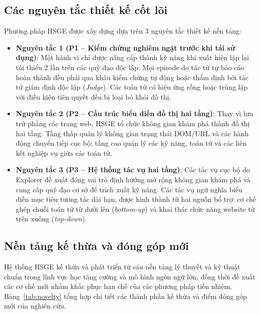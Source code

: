 \subsection{Các nguyên tắc thiết kế cốt lõi}

Phương pháp HSGE được xây dựng dựa trên 3 nguyên tắc thiết kế nền tảng:
\begin{itemize}
  \item \textbf{Nguyên tắc 1 (P1 -- Kiểm chứng nghiêm ngặt trước khi tái sử dụng)}: Một hành vi chỉ được nâng cấp thành kỹ năng khi xuất hiện lặp lại tối thiểu 2 lần trên các quỹ đạo độc lập. Mọi episode do tác tử tự báo cáo hoàn thành đều phải qua khâu kiểm chứng tự động hoặc thẩm định bởi tác tử giám định độc lập (\textit{Judge}). Các toán tử có hiệu ứng rỗng hoặc trùng lặp với điều kiện tiên quyết đều bị loại bỏ khỏi đồ thị.
  \item \textbf{Nguyên tắc 2 (P2 -- Cấu trúc biểu diễn đồ thị hai tầng)}: Thay vì lưu trữ phẳng các trang web, HSGE tổ chức không gian khám phá thành đồ thị hai tầng. Tầng thấp quản lý không gian trạng thái DOM/URL và các hành động chuyển tiếp cục bộ; tầng cao quản lý các kỹ năng, toán tử và các liên kết nghiệp vụ giữa các toán tử.
  \item \textbf{Nguyên tắc 3 (P3 -- Hệ thống tác vụ hai tầng)}: Các tác vụ cục bộ do Explorer đề xuất đóng vai trò định hướng mở rộng không gian khám phá và cung cấp quỹ đạo cơ sở để trích xuất kỹ năng. Các tác vụ ngữ nghĩa biểu diễn mục tiêu tương tác dài hạn, được hình thành từ hai nguồn bổ trợ: cơ chế ghép chuỗi toán tử từ dưới lên (\textit{bottom-up}) và khai thác chức năng website từ trên xuống (\textit{top-down}).
\end{itemize}

\subsection{Nền tảng kế thừa và đóng góp mới}
\label{sec:method-novelty}

Hệ thống HSGE kế thừa và phát triển từ sáu nền tảng lý thuyết và kỹ thuật chuẩn trong lĩnh vực học tăng cường và mô hình ngôn ngữ lớn, đồng thời đề xuất các cơ chế mới nhằm khắc phục hạn chế của các phương pháp tiền nhiệm. Bảng~\ref{tab:novelty} tổng hợp chi tiết các thành phần kế thừa và điểm đóng góp mới của nghiên cứu.

